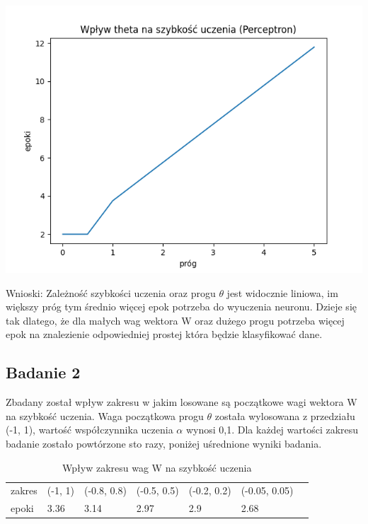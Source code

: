 \documentclass{article}
\begin{document}
\begin{center}
\includegraphics[scale=0.8]{per_exp1.png}
\end{center}

Wnioski: Zależność szybkości uczenia oraz progu $\theta$ jest widocznie liniowa, im większy próg tym średnio więcej epok potrzeba do wyuczenia neuronu. Dzieje się tak dlatego, że dla małych wag wektora W oraz dużego progu potrzeba więcej epok na znalezienie odpowiedniej prostej która będzie klasyfikować dane.

\newpage
\subsection{Badanie 2}

Zbadany został wpływ zakresu w jakim losowane są początkowe wagi wektora W na szybkość uczenia. Waga początkowa progu $\theta$ została wylosowana z przedziału (-1, 1), wartość współczynnika uczenia $\alpha$ wynosi 0,1. Dla każdej wartości zakresu badanie zostało powtórzone sto razy, poniżej uśrednione wyniki badania.\\


\begin{table}[h]
  \centering
  \caption{Wpływ zakresu wag W na szybkość uczenia}
  \begin{tabular}{lllllll}
    \toprule
    zakres & (-1, 1) & (-0.8, 0.8) & (-0.5, 0.5) & (-0.2, 0.2) & (-0.05, 0.05) \\
    epoki & 3.36 & 3.14 & 2.97 & 2.9 & 2.68 \\
    \bottomrule
  \end{tabular}
\end{table}
\end{document}
